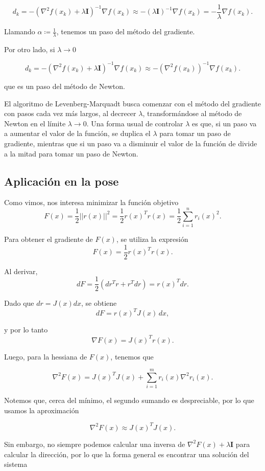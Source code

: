 $$
d_k = -(\nabla^2f(x_k) + \lambda \mathbf{I})^{-1} \nabla f(x_k) \approx
-(\lambda \mathbf{I})^{-1} \nabla f(x_k) = -\frac{1}{\lambda} \nabla f(x_k).
$$

Llamando $\alpha \coloneq \frac{1}{\lambda}$, tenemos un paso del método del gradiente.

Por otro lado, si $\lambda \to 0$

$$
d_k = -(\nabla^2f(x_k) + \lambda \mathbf{I})^{-1} \nabla f(x_k) \approx
- (\nabla^2 f(x_k))^{-1} \nabla f(x_k).
$$

que es un paso del método de Newton.

El algoritmo de Levenberg-Marquadt busca comenzar con el método del gradiente con pasos cada vez más largos, al decrecer $\lambda$, transformándose al método de Newton en el límite  $\lambda \to 0$. Una forma usual de controlar $\lambda$ es que, si un paso va a aumentar el valor de la función, se duplica el $\lambda$ para tomar un paso de gradiente, mientras que si un paso va a disminuir el valor de la función de divide a la mitad para tomar un paso de Newton.

\subsection{Aplicación en la pose}
Como vimos, nos interesa minimizar la función objetivo
$$
F(x) = \frac{1}{2}||r(x)||^2 = \frac{1}{2} r(x)^T r(x) = \frac{1}{2}\sum_{i=1}^{n}r_i(x)^2.
$$


Para obtener el gradiente de $F(x)$, se utiliza la expresión
$$
F(x) = \frac{1}{2} r(x)^T r(x).
$$

Al derivar,
$$
dF = \frac{1}{2}(dr^T r + r^T dr) = r(x)^T dr.
$$

Dado que $dr = J(x)dx$, se obtiene
$$
dF = r(x)^T J(x)\,dx,
$$

\noindent y por lo tanto
$$
\nabla F(x) = J(x)^T r(x).
$$

Luego, para la hessiana de $F(x)$, tenemos que

$$
\nabla^2 F(x) = J(x)^T J(x) + \sum_{i=1}^m r_i(x) \nabla^2 r_i(x).
$$

Notemos que, cerca del mínimo, el segundo sumando es despreciable, por lo que usamos la aproximación

$$
\nabla^2 F(x) \approx J(x)^T J(x).
$$

Sin embargo, no siempre podemos calcular una inversa de $\nabla^2 F(x) + \lambda \mathbf{I}$ para calcular la dirección, por lo que la forma general es encontrar una solución del sistema

